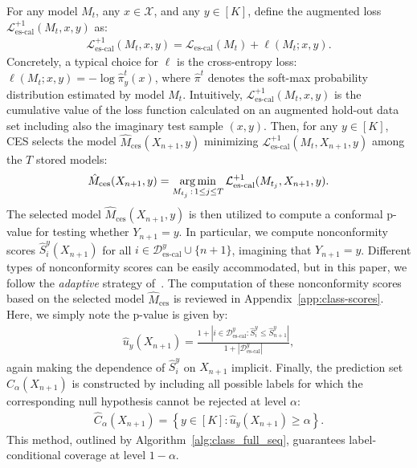 For any model $M_t$, any $x \in \mathcal{X}$, and any $y \in [K]$, define the augmented loss $\mathcal{L}_{\text{es-cal}}^{+1}(M_t,x,y)$  as:
\begin{align} \label{eq:loss-ces-class}
\mathcal{L}_{\text{es-cal}}^{+1}(M_t,x,y) = \mathcal{L}_{\text{es-cal}}(M_t) + \ell(M_t; x, y).
\end{align}
Concretely, a typical choice for $\ell$ is the cross-entropy loss: $\ell(M_t; x, y) = - \log \hat{\pi}^t_y(x)$, where $\hat{\pi}^t$ denotes the soft-max probability distribution estimated by model $M_t$.
Intuitively, $\mathcal{L}_{\text{es-cal}}^{+1}(M_t,x,y)$ is the cumulative value of the loss function calculated on an augmented hold-out data set including also the imaginary test sample $(x,y)$.
Then, for any $y \in [K]$, CES selects the model $\hat{M}_{\text{ces}}(X_{n+1},y)$ minimizing $\mathcal{L}_{\text{es-cal}}^{+1}(M_t,X_{n+1},y)$ among the $T$ stored models:
\begin{align} \label{eq:ces-model-class}
\hat{M}_{\text{ces}}(X_{n+1},y) = \operatorname*{arg\,min}_{M_{t_j} \, : \, 1 \leq j \leq T} \mathcal{L}_{\text{es-cal}}^{+1}(M_{t_j},X_{n+1},y).
\end{align}
The selected model $\hat{M}_{\text{ces}}(X_{n+1},y)$ is then utilized to compute a conformal p-value for testing whether $Y_{n+1}=y$.
In particular, we compute nonconformity scores $\hat{S}_i^y(X_{n+1})$ for all $i \in \mathcal{D}^y_{\text{es-cal}} \cup \{n+1\}$, imagining that $Y_{n+1}=y$. Different types of nonconformity scores can be easily accommodated, but in this paper, we follow the {\em adaptive} strategy of~\citet{romano2020classification}. The computation of these nonconformity scores based on the selected model $\hat{M}_{\text{ces}}$ is reviewed in Appendix~\ref{app:class-scores}.
Here, we simply note the p-value is given by:
\begin{align}\label{eq:conformal_pval-class}
    \hat{u}_y(X_{n+1}) = \frac{1 + |i \in \mathcal{D}^y_{\text{es-cal}}: \hat{S}^y_{i} \leq \hat{S}^y_{n+1}|}{1+|\mathcal{D}^y_{\text{es-cal}}|},
\end{align}
again making the dependence of $\hat{S}^y_{i}$ on $X_{n+1}$ implicit.
Finally, the prediction set $\hat{C}_{\alpha}(X_{n+1})$ is constructed by including all possible labels for which the corresponding null hypothesis cannot be rejected at level $\alpha$:
\begin{align} \label{eq:pred-set-class}
  \hat{C}_{\alpha}(X_{n+1}) = \left\{ y \in [K] : \hat{u}_y(X_{n+1})  \geq \alpha \right\}.
\end{align}
This method, outlined by Algorithm~\ref{alg:class_full_seq}, guarantees label-conditional coverage at level $1-\alpha$.

